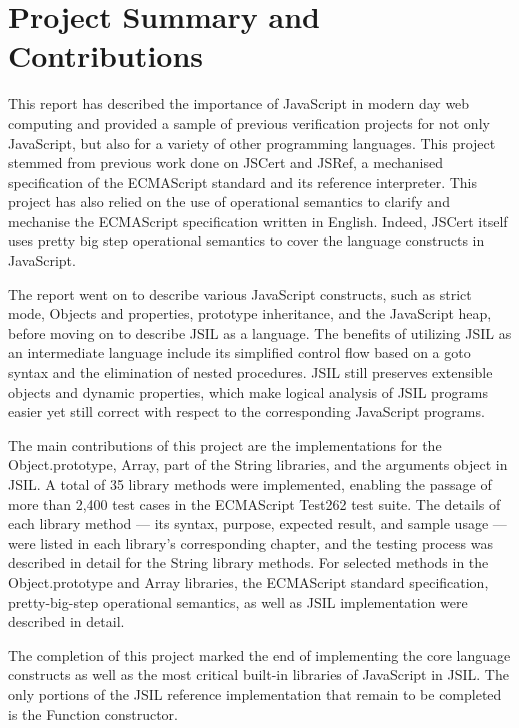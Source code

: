 \documentclass[a4paper,11pt,twoside]{report}
\begin{document}
\section{Project Summary and Contributions}
This report has described the importance of JavaScript in modern day web computing and provided a sample of previous verification projects for not only JavaScript, but also for a variety of other programming languages. This project stemmed from previous work done on JSCert and JSRef, a mechanised specification of the ECMAScript standard and its reference interpreter. 
This project has also relied on the use of operational semantics to clarify and mechanise the ECMAScript specification written in English. Indeed, JSCert itself uses pretty big step operational semantics to cover the language constructs in JavaScript. 

\smallskip
The report went on to describe various JavaScript constructs, such as strict mode, Objects and properties, prototype inheritance, and the JavaScript heap, before moving on to describe JSIL as a language. The benefits of utilizing JSIL as an intermediate language include its simplified control flow based on a goto syntax and the elimination of nested procedures. JSIL still preserves extensible objects and dynamic properties, which make logical analysis of JSIL programs easier yet still correct with respect to the corresponding JavaScript programs.

\smallskip
The main contributions of this project are the implementations for the Object.prototype, Array, part of the String libraries, and the arguments object in JSIL. A total of 35 library methods were implemented, enabling the passage of more than 2,400 test cases in the ECMAScript Test262 test suite. The details of each library method --- its syntax, purpose, expected result, and sample usage --- were listed in each library's corresponding chapter, and the testing process was described in detail for the String library methods. For selected methods in the Object.prototype and Array libraries, the ECMAScript standard specification, pretty-big-step operational semantics, as well as JSIL implementation were described in detail.

\smallskip
The completion of this project marked the end of implementing the core language constructs as well as the most critical built-in libraries of JavaScript in JSIL. The only portions of the JSIL reference implementation that remain to be completed is the Function constructor. %
\end{document}
